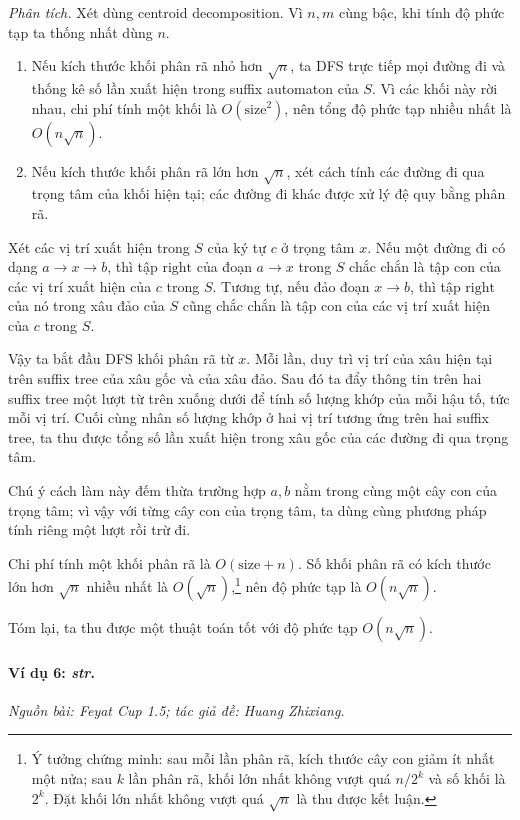 \documentclass[11pt]{article}
\begin{document}
\emph{Phân tích.}
Xét dùng centroid decomposition. Vì \(n,m\) cùng bậc, khi tính độ phức tạp ta
thống nhất dùng \(n\).
\begin{enumerate}
  \item Nếu kích thước khối phân rã nhỏ hơn \(\sqrt n\), ta DFS trực tiếp mọi
  đường đi và thống kê số lần xuất hiện trong suffix automaton của \(S\). Vì
  các khối này rời nhau, chi phí tính một khối là \(O(\mathrm{size}^2)\), nên
  tổng độ phức tạp nhiều nhất là \(O(n\sqrt n)\).

  \item Nếu kích thước khối phân rã lớn hơn \(\sqrt n\), xét cách tính các
  đường đi qua trọng tâm của khối hiện tại; các đường đi khác được xử lý đệ quy
  bằng phân rã.
\end{enumerate}

Xét các vị trí xuất hiện trong \(S\) của ký tự \(c\) ở trọng tâm \(x\). Nếu một
đường đi có dạng \(a\to x\to b\), thì tập \(\mathrm{right}\) của đoạn
\(a\to x\) trong \(S\) chắc chắn là tập con của các vị trí xuất hiện của \(c\)
trong \(S\). Tương tự, nếu đảo đoạn \(x\to b\), thì tập \(\mathrm{right}\) của
nó trong xâu đảo của \(S\) cũng chắc chắn là tập con của các vị trí xuất hiện
của \(c\) trong \(S\).

Vậy ta bắt đầu DFS khối phân rã từ \(x\). Mỗi lần, duy trì vị trí của xâu hiện
tại trên suffix tree của xâu gốc và của xâu đảo. Sau đó ta đẩy thông tin trên
hai suffix tree một lượt từ trên xuống dưới để tính số lượng khớp của mỗi hậu
tố, tức mỗi vị trí. Cuối cùng nhân số lượng khớp ở hai vị trí tương ứng trên
hai suffix tree, ta thu được tổng số lần xuất hiện trong xâu gốc của các đường
đi qua trọng tâm.

Chú ý cách làm này đếm thừa trường hợp \(a,b\) nằm trong cùng một cây con của
trọng tâm; vì vậy với từng cây con của trọng tâm, ta dùng cùng phương pháp tính
riêng một lượt rồi trừ đi.

Chi phí tính một khối phân rã là \(O(\mathrm{size}+n)\). Số khối phân rã có kích
thước lớn hơn \(\sqrt n\) nhiều nhất là \(O(\sqrt n)\),\footnote{Ý tưởng chứng
minh: sau mỗi lần phân rã, kích thước cây con giảm ít nhất một nửa; sau \(k\)
lần phân rã, khối lớn nhất không vượt quá \(n/2^k\) và số khối là \(2^k\). Đặt
khối lớn nhất không vượt quá \(\sqrt n\) là thu được kết luận.} nên độ phức tạp
là \(O(n\sqrt n)\).

Tóm lại, ta thu được một thuật toán tốt với độ phức tạp \(O(n\sqrt n)\).

\paragraph{Ví dụ 6: \emph{str}.}
\emph{Nguồn bài: Feyat Cup 1.5; tác giả đề: Huang Zhixiang.}
\end{document}
